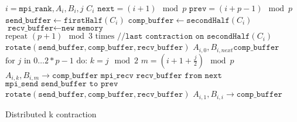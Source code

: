 \begin{algorithm}[ht]
    \begin{algorithmic}
    \Require $i = \texttt{mpi\_rank}, A_i, B_i, j$
    \Ensure $C_i$
    \State $\texttt{next} = (i+1) \mod p$
    \State $\texttt{prev} = (i+p-1) \mod p$
    \State $\texttt{send\_buffer} \gets \texttt{firstHalf}(C_i)$
    \State $\texttt{comp\_buffer} \gets \texttt{secondHalf}(C_i)$
    \State $\texttt{recv\_buffer} \gets \texttt{new memory}$
    \State $\text{repeat } (p+1) \mod 3 \text{ times} \texttt{ //last contraction on secondHalf}(C_i)$ 
    \State \indent $\texttt{rotate}(\texttt{send\_buffer},\texttt{comp\_buffer},\texttt{recv\_buffer})$
    \State $A_{i,0}, B_{i,next} \texttt{comp\_buffer}$
    \State  $\text{for } j \text{ in } 0\dots 2 * p - 1 \text{ do:}$
    \State \indent $ k = j \mod 2 $
    \State \indent $ m = (i + 1 + \frac{j}{2}) \mod p$
    \State \indent {}
    \State \indent \indent $A_{i,k}, B_{i,m} \rightarrow \texttt{comp\_buffer}$
    \State \indent \indent $\texttt{mpi\_recv recv\_buffer from next}$
    \State \indent \indent $\texttt{mpi\_send send\_buffer to prev}$
    \State \indent $\texttt{rotate}(\texttt{send\_buffer},\texttt{comp\_buffer},\texttt{recv\_buffer})$
    \State $A_{i,1}, B_{i,i} \rightarrow \texttt{comp\_buffer}$

\end{algorithmic}
\caption{Distributed k contraction}
\label{alg:k_pseudocode}
\end{algorithm}


